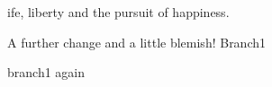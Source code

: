 \documentclass{article}
\begin{document}
ife, liberty and the pursuit of happiness.

A further change and a little blemish! Branch1

branch1 again
\end{document}
